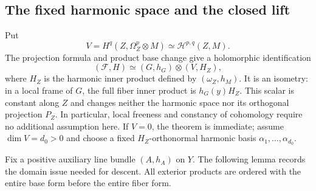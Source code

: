 \documentclass[11pt,reqno]{amsart}
\numberwithin{equation}{section}
\theoremstyle{definition}
\theoremstyle{remark}
\newcommand{\cH}{\mathcal H}
\newcommand{\cF}{\mathcal F}
\begin{document}
\subsection{The fixed harmonic space and the closed lift}
Put
\[
 V=H^q(Z,\Omega_Z^p\otimes M)
      \simeq\cH^{p,q}(Z,M).
\]
The projection formula and product base change give a holomorphic identification
\begin{equation}\label{eq:product-isometry}
 (\cF,H)\simeq(G,h_G)\otimes(V,H_Z),
\end{equation}
where $H_Z$ is the harmonic inner product defined by $(\omega_Z,h_M)$. It is an isometry: in a local frame of $G$, the full fiber inner product is $h_G(y)H_Z$. This scalar is constant along $Z$ and changes neither the harmonic space nor its orthogonal projection $P_Z$. In particular, local freeness and constancy of cohomology require no additional assumption here. If $V=0$, the theorem is immediate; assume $\dim V=d_0>0$ and choose a fixed $H_Z$-orthonormal harmonic basis $\alpha_1,\ldots,\alpha_{d_0}$.

Fix a positive auxiliary line bundle $(A,h_A)$ on $Y$. The following lemma records the domain issue needed for descent. All exterior products are ordered with the entire base form before the entire fiber form.
\end{document}
